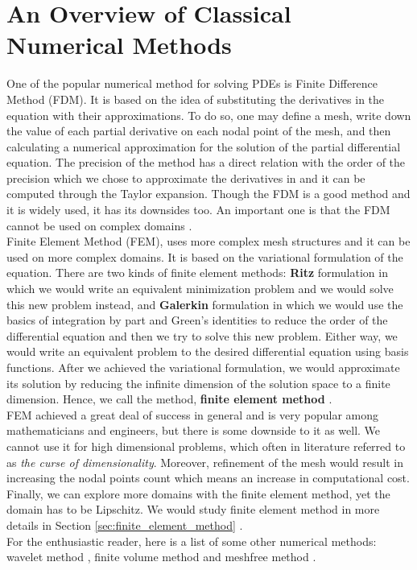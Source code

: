 \section{An Overview of Classical Numerical Methods}
\label{sec:overviewof_FEM_FDM}
One of the popular  numerical method for solving PDEs is  Finite Difference Method (FDM). It is based on the idea of substituting the derivatives in the equation with their approximations. To do so, one may define a mesh, write down the value of each partial derivative on each nodal point of the mesh, and then calculating a numerical approximation for the solution of the partial differential equation. The precision of the method has a direct relation with the order of the precision which we chose to approximate the derivatives in and it can be computed through the Taylor expansion. Though the FDM is a good method and it is widely used, it has its downsides too. An important one is that the FDM cannot be used on complex domains \cite{forsythe1960finite, smith1985numerical, morton2005numerical}.\\
Finite Element Method (FEM), uses more complex mesh structures and it can be used on more complex domains. It is based on the variational formulation of the equation. There are two kinds of finite element methods: \textbf{Ritz} formulation in which we would write an equivalent minimization problem and we would solve this new problem instead, and \textbf{Galerkin} formulation in which we would use the basics of integration by part and Green's identities to reduce the order of the differential equation and then we try to solve this new problem. Either way, we would write an equivalent problem to the desired differential equation using basis functions. After we achieved the variational formulation, we would approximate its solution by reducing the infinite dimension of the solution space to a finite dimension. Hence, we call the method, \textbf{finite element method} \cite{suli2012lecture, johnson2012numerical}.\\
FEM achieved a great deal of success in general and is very popular among mathematicians and engineers, but there is some downside to it as well. We cannot use it for high dimensional problems, which often in literature referred to as \textit{the curse of dimensionality}. Moreover, refinement of the mesh would result in increasing the nodal points count which means an increase in computational cost. Finally, we can explore more domains with the finite element method, yet the domain has to be Lipschitz. We would study finite element method in more details in Section \eqref{sec:finite_element_method} \cite{zienkiewicz1977finite, cook2007concepts}.\\
For the enthusiastic reader, here is a list of some other numerical methods: wavelet method \cite{dahmen1997multiscale, lepik2005numerical}, finite volume method \cite{moukalled2016finite, leveque2002finite} and meshfree method \cite{liu2003smoothed, liu2009meshfree}.
